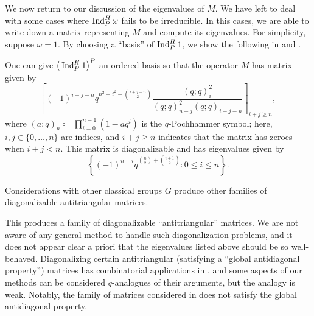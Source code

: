 \documentclass{amsart}
\begin{document}
We now return to our discussion of the eigenvalues of $M$. We have left to deal with some cases where $\operatorname{Ind}_P^H\omega$ fails to be irreducible. In this cases, we are able to write down a matrix representing $M$ and compute its eigenvalues. For simplicity, suppose $\omega=1$. By choosing a ``basis'' of $\operatorname{Ind}_P^H1$, we show the following in  and .
\begin{theorem} \label{thm:sln-eigens}
    One can give $\big(\operatorname{Ind}_P^H1\big)^P$ an ordered basis so that the operator $M$ has matrix given by
    \[\left[(-1)^{i+j-n}q^{n^2-i^2+\binom{i+j-n}2}\frac{(q;q)_i^2}{(q;q)_{n-j}^2(q;q)_{i+j-n}}\right]_{i+j\ge n},\]
    where $(a;q)_n\coloneqq\prod_{i=0}^{n-1}\left(1-aq^i\right)$ is the $q$-Pochhammer symbol; here, $i,j\in\{0,\ldots,n\}$ are indices, and $i+j\ge n$ indicates that the matrix has zeroes when $i+j< n$. This matrix is diagonalizable and has eigenvalues given by
    \[\left\{(-1)^{n-i}q^{\binom n2+\binom{i+1}2}:0\le i\le n\right\}.\]
\end{theorem}
\begin{remark}
    Considerations with other classical groups $G$ produce other families of diagonalizable antitriangular matrices.
\end{remark}
This produces a family of diagonalizable ``antitriangular'' matrices. We are not aware of any general method to handle such diagonalization problems, and it does not appear clear a priori that the eigenvalues listed above should be so well-behaved. Diagonalizing certain antitriangular (satisfying a ``global antidiagonal property'') matrices has combinatorial applications in \cite{britnell-antitriangular}, and some aspects of our methods can be considered $q$-analogues of their arguments, but the analogy is weak. Notably, the family of matrices considered in  does not satisfy the global antidiagonal property.


\end{document}

